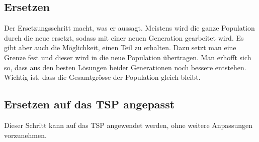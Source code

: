 %
%
%
%
\subsection{Ersetzen
\label{varalgbuch:paper:varalg:subsection:replacement}}
Der Ersetzungsschritt macht, was er aussagt. Meistens wird die ganze 
Population durch die neue ersetzt, sodass mit einer neuen Generation gearbeitet wird.
Es gibt aber auch die Möglichkeit, einen Teil zu erhalten. Dazu setzt man eine 
Grenze fest und dieser wird in die neue Population übertragen. Man erhofft sich so, 
dass aus den besten Lösungen beider Generationen noch bessere entstehen.
Wichtig ist, dass die Gesamtgrösse der Population gleich bleibt.

\subsection{Ersetzen auf das TSP angepasst
\label{buch:paper:varalg:subsection:replacement_tsp}}
Dieser Schritt kann auf das TSP angewendet werden, ohne weitere
Anpassungen vorzunehmen.
